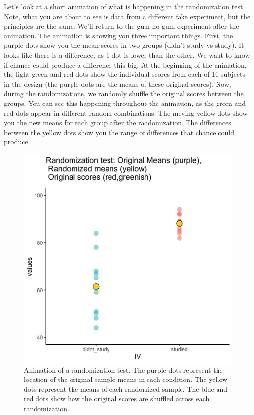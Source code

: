\documentclass[]{book}
\begin{document}
Let's look at a short animation of what is happening in the randomization test. Note, what you are about to see is data from a different fake experiment, but the principles are the same. We'll return to the gum no gum experiment after the animation. The animation is showing you three important things. First, the purple dots show you the mean scores in two groups (didn't study vs study). It looks like there is a difference, as 1 dot is lower than the other. We want to know if chance could produce a difference this big. At the beginning of the animation, the light green and red dots show the individual scores from each of 10 subjects in the design (the purple dots are the means of these original scores). Now, during the randomizations, we randomly shuffle the original scores between the groups. You can see this happening throughout the animation, as the green and red dots appear in different random combinations. The moving yellow dots show you the new means for each group after the randomization. The differences between the yellow dots show you the range of differences that chance could produce.

\begin{figure}
\centering
\includegraphics{gifs/randomizationTest-1.gif}
\caption{\label{fig:5randtest}Animation of a randomization test. The purple dots represent the location of the original sample means in each condition. The yellow dots represent the means of each randomized sample. The blue and red dots show how the original scores are shuffled across each randomization.}
\end{figure}
\end{document}
